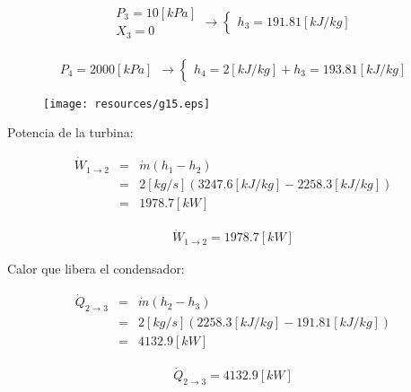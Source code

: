 \documentclass[letter,10pt]{article}
\begin{document}
\begin{enumerate}
\begin{eqnarray*}
    \begin{array}{c}
        P_3 = 10[kPa] \\
        X_3 = 0
    \end{array}
    \rightarrow
    \begin{cases}
        h_3 = 191.81[kJ/kg]
    \end{cases}
\end{eqnarray*}

\begin{eqnarray*}
    \begin{array}{c}
        P_4 = 2000[kPa]
    \end{array}
    \rightarrow
    \begin{cases}
        h_4 = 2[kJ/kg] + h_3 = 193.81[kJ/kg]
    \end{cases}
\end{eqnarray*}

\begin{figure}[H]
\centering
\texttt{[image: resources/g15.eps]}
\end{figure}

Potencia de la turbina:

\begin{eqnarray*}
    \dot{W}_{1\rightarrow2} &=& \dot{m}(h_1 - h_2) \\
                            &=& 2[kg/s](3247.6[kJ/kg]-2258.3[kJ/kg]) \\
                            &=& 1978.7[kW]
\end{eqnarray*}

\begin{equation*}
\boxed{
    \begin{array}{l}
        \dot{W}_{1\rightarrow2} = 1978.7[kW]
    \end{array}
}
\end{equation*}

Calor que libera el condensador:

\begin{eqnarray*}
    \dot{Q}_{2\rightarrow3} &=& \dot{m}(h_2 - h_3) \\
                            &=& 2[kg/s](2258.3[kJ/kg]-191.81[kJ/kg]) \\
                            &=& 4132.9[kW]
\end{eqnarray*}

\begin{equation*}
\boxed{
    \begin{array}{l}
        \dot{Q}_{2\rightarrow3} = 4132.9[kW]
    \end{array}
}
\end{equation*}


\end{enumerate}
\end{document}

